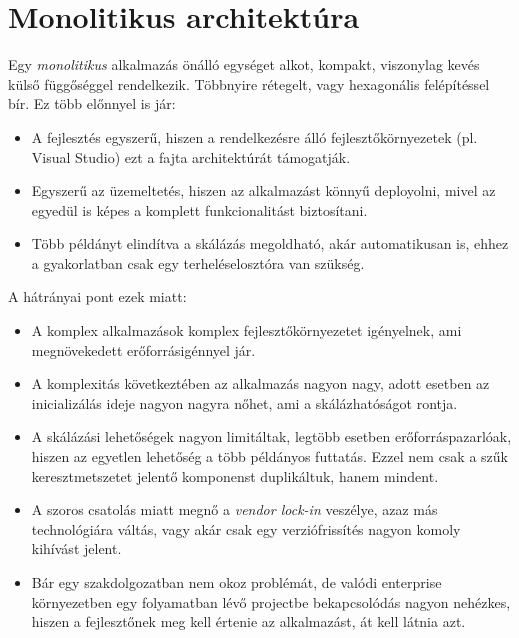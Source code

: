 \section{Monolitikus architektúra}

Egy \emph{monolitikus} alkalmazás önálló egységet alkot, kompakt, viszonylag
kevés külső függőséggel rendelkezik. Többnyire rétegelt, vagy hexagonális
felépítéssel bír. Ez több előnnyel is jár:

\begin{itemize}
  \item A fejlesztés egyszerű, hiszen a rendelkezésre álló fejlesztőkörnyezetek
    (pl. Visual Studio) ezt a fajta architektúrát támogatják.
  \item Egyszerű az üzemeltetés, hiszen az alkalmazást könnyű deployolni, mivel
    az egyedül is képes a komplett funkcionalitást biztosítani.
  \item Több példányt elindítva a skálázás megoldható, akár automatikusan is,
    ehhez a gyakorlatban csak egy terheléselosztóra van szükség.
\end{itemize}

A hátrányai pont ezek miatt:

\begin{itemize}
  \item A komplex alkalmazások komplex fejlesztőkörnyezetet igényelnek, ami
    megnövekedett erőforrásigénnyel jár.
  \item A komplexitás következtében az alkalmazás nagyon nagy, adott esetben
    az inicializálás ideje nagyon nagyra nőhet, ami a skálázhatóságot rontja.
  \item A skálázási lehetőségek nagyon limitáltak, legtöbb esetben
    erőforráspazarlóak, hiszen az egyetlen lehetőség a több példányos futtatás.
    Ezzel nem csak a szűk keresztmetszetet jelentő komponenst duplikáltuk,
    hanem mindent.
  \item A szoros csatolás miatt megnő a \emph{vendor lock-in} veszélye,
    azaz más technológiára váltás, vagy akár csak egy verziófrissítés
    nagyon komoly kihívást jelent.
  \item Bár egy szakdolgozatban nem okoz problémát, de valódi enterprise
    környezetben egy folyamatban lévő projectbe bekapcsolódás nagyon nehézkes,
    hiszen a fejlesztőnek meg kell értenie az alkalmazást, át kell látnia azt.
\end{itemize}
